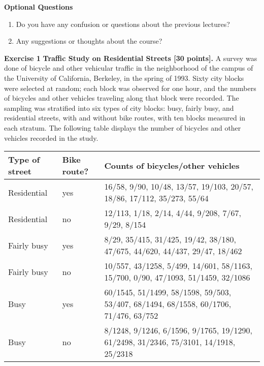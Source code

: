 \documentclass[11pt,notitlepage]{article}
\newcommand{\MBlue}[1]{{\color{MBlue}#1}}
\begin{document}
    \vskip10pt
    \noindent
    \textbf{\large \MBlue{Optional Questions}}
    \begin{enumerate}
        \item Do you have any confusion or questions about the previous lectures? 
        \item Any suggestions or thoughts about the course?
    \end{enumerate}
	\begin{exercise}[Suggestions]
    \end{exercise}

    \newpage
    \noindent
    \textbf{\large \MBlue{Exercise 1}}
    \vskip10pt
    \noindent
    \textbf{Traffic Study on Residential Streets [30 points].} A survey was done of bicycle and other vehicular traffic in the neighborhood of the campus of the University of California, Berkeley, in the spring of 1993. Sixty city blocks were selected at random; each block was observed for one hour,
    and the numbers of bicycles and other vehicles traveling along that block were recorded. The sampling was stratified into six types of city blocks: busy, fairly busy, and residential streets, with and without bike routes, with ten blocks measured in each stratum. The following table displays the number of bicycles and other vehicles recorded in the study. 
    \begin{center}
        \begin{tabular}{llp{8cm}}
            \hline
            \textbf{Type of street} & \textbf{Bike route?} & \textbf{Counts of bicycles/other vehicles} \\
            \hline
            Residential & yes & 16/58, 9/90, 10/48, 13/57, 19/103, 20/57, 18/86, 17/112, 35/273, 55/64 \\
            Residential & no & 12/113, 1/18, 2/14, 4/44, 9/208, 7/67, 9/29, 8/154 \\
            Fairly busy & yes & 8/29, 35/415, 31/425, 19/42, 38/180, 47/675, 44/620, 44/437, 29/47, 18/462 \\
            Fairly busy & no & 10/557, 43/1258, 5/499, 14/601, 58/1163, 15/700, 0/90, 47/1093, 51/1459, 32/1086 \\
            Busy & yes & 60/1545, 51/1499, 58/1598, 59/503, 53/407, 68/1494, 68/1558, 60/1706, 71/476, 63/752 \\
            Busy & no & 8/1248, 9/1246, 6/1596, 9/1765, 19/1290, 61/2498, 31/2346, 75/3101, 14/1918, 25/2318 \\
            \hline
        \end{tabular}
    \end{center}
\end{document}
